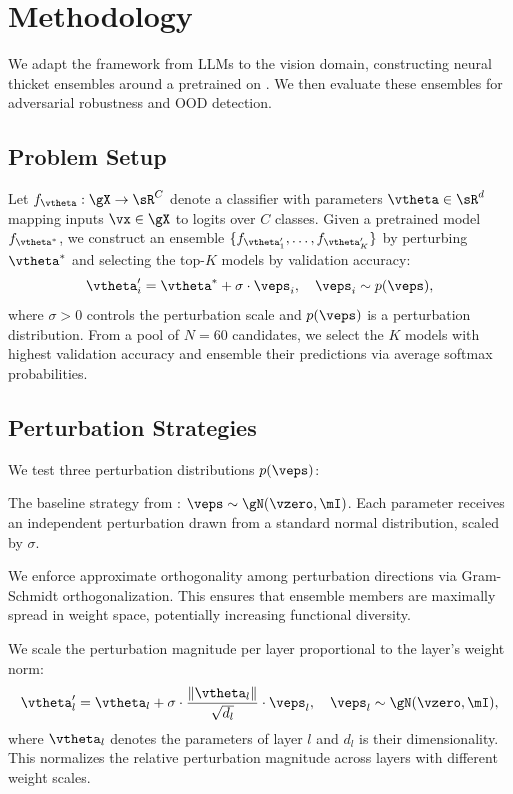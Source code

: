 \section{Methodology}
\label{sec:method}

We adapt the \randopt framework \citep{gan2026neural} from LLMs to the vision domain, constructing neural thicket ensembles around a pretrained \resnet on \cifarten. We then evaluate these ensembles for adversarial robustness and OOD detection.

\subsection{Problem Setup}

Let $f_{\vtheta}: \gX \to \sR^C$ denote a classifier with parameters $\vtheta \in \sR^d$ mapping inputs $\vx \in \gX$ to logits over $C$ classes. Given a pretrained model $f_{\vtheta^*}$, we construct an ensemble $\{f_{\vtheta_1'}, \ldots, f_{\vtheta_K'}\}$ by perturbing $\vtheta^*$ and selecting the top-$K$ models by validation accuracy:
\begin{equation}
    \vtheta_i' = \vtheta^* + \sigma \cdot \veps_i, \quad \veps_i \sim p(\veps),
    \label{eq:perturbation}
\end{equation}
where $\sigma > 0$ controls the perturbation scale and $p(\veps)$ is a perturbation distribution. From a pool of $N = 60$ candidates, we select the $K$ models with highest validation accuracy and ensemble their predictions via average softmax probabilities.

\subsection{Perturbation Strategies}

We test three perturbation distributions $p(\veps)$:

 The baseline strategy from \citet{gan2026neural}: $\veps \sim \gN(\vzero, \mI)$. Each parameter receives an independent perturbation drawn from a standard normal distribution, scaled by $\sigma$.

 We enforce approximate orthogonality among perturbation directions via Gram-Schmidt orthogonalization. This ensures that ensemble members are maximally spread in weight space, potentially increasing functional diversity.

 We scale the perturbation magnitude per layer proportional to the layer's weight norm:
\begin{equation}
    \vtheta_l' = \vtheta_l + \sigma \cdot \frac{\|\vtheta_l\|}{\sqrt{d_l}} \cdot \veps_l, \quad \veps_l \sim \gN(\vzero, \mI),
    \label{eq:layer_scaled}
\end{equation}
where $\vtheta_l$ denotes the parameters of layer $l$ and $d_l$ is their dimensionality. This normalizes the relative perturbation magnitude across layers with different weight scales.

